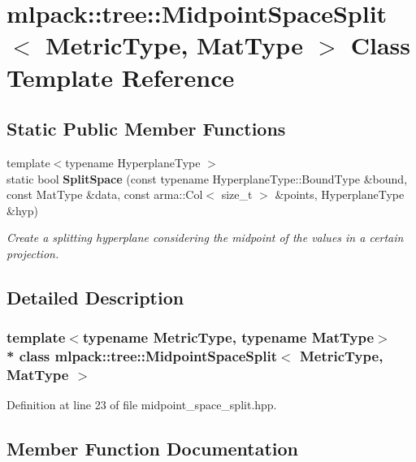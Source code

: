 \section{mlpack\+:\+:tree\+:\+:Midpoint\+Space\+Split$<$ Metric\+Type, Mat\+Type $>$ Class Template Reference}
\label{classmlpack_1_1tree_1_1MidpointSpaceSplit}
\subsection*{Static Public Member Functions}
\begin{DoxyCompactItemize}
\item 
{\footnotesize template$<$typename Hyperplane\+Type $>$ }\\static bool {\bf Split\+Space} (const typename Hyperplane\+Type\+::\+Bound\+Type \&bound, const Mat\+Type \&data, const arma\+::\+Col$<$ size\+\_\+t $>$ \&points, Hyperplane\+Type \&hyp)
\begin{DoxyCompactList}\small\item\em Create a splitting hyperplane considering the midpoint of the values in a certain projection. \end{DoxyCompactList}\end{DoxyCompactItemize}


\subsection{Detailed Description}
\subsubsection*{template$<$typename Metric\+Type, typename Mat\+Type$>$\\*
class mlpack\+::tree\+::\+Midpoint\+Space\+Split$<$ Metric\+Type, Mat\+Type $>$}



Definition at line 23 of file midpoint\+\_\+space\+\_\+split.\+hpp.



\subsection{Member Function Documentation}

